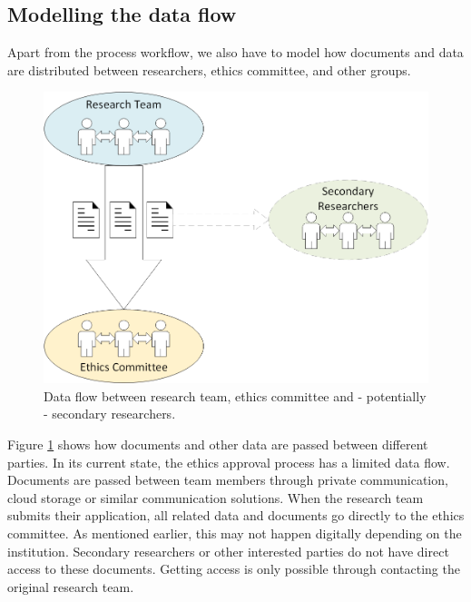 \documentclass[10pt]{article}
\begin{document}
\subsection{Modelling the data flow}
Apart from the process workflow, we also have to model how documents and data are distributed between researchers, ethics committee, and other groups.
\begin{figure}
\centering
	\includegraphics[width=1\textwidth]{img/dataflow.png}
	\caption{Data flow between research team, ethics committee and \-- potentially \-- secondary researchers.}
	\label{fig:dataflow}
\end{figure}

Figure \ref{fig:dataflow} shows how documents and other data are passed between different parties. In its current state, the ethics approval process has a limited data flow. Documents are passed between team members through private communication, cloud storage or similar communication solutions. When the research team submits their application, all related data and documents go directly to the ethics committee. As mentioned earlier, this may not happen digitally depending on the institution. Secondary researchers or other interested parties do not have direct access to these documents. Getting access is only possible through contacting the original research team. 
\end{document}
